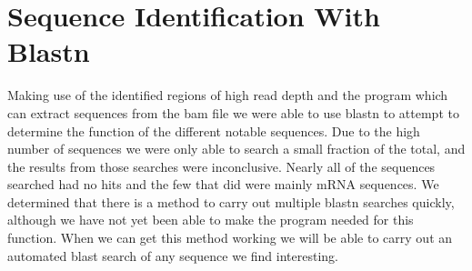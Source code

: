 \documentclass[12pt]{article}
\begin{document}
\section{Sequence Identification With Blastn}
\vspace{-0.5cm}
	Making use of the identified regions of high read depth and the program which can extract sequences from the bam file we were able to use blastn to attempt to determine the function of the different notable sequences. Due to the high number of sequences we were only able to search a small fraction of the total, and the results from those searches were inconclusive. Nearly all of the sequences searched had no hits and the few that did were mainly mRNA sequences. We determined that there is a method to carry out multiple blastn searches quickly, although we have not yet been able to make the program needed for this function. When we can get this method working we will be able to carry out an automated blast search of any sequence we find interesting.   

%
%
\vspace{-0.5cm}
\end{document}
